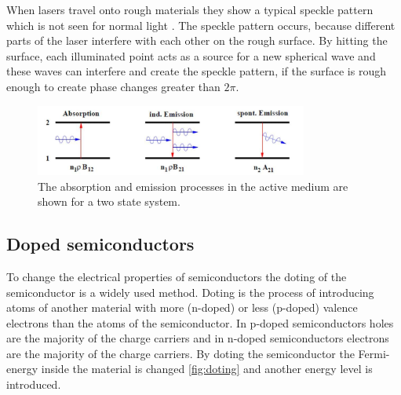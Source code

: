 When lasers travel onto rough materials they show a typical speckle pattern which is not seen for normal light \cite{speckle}.
The speckle pattern occurs, because different parts of the laser interfere with each other on the rough surface.
By hitting the surface, each illuminated point acts as a source for a new spherical wave and these waves can interfere and create the speckle pattern, if the surface is rough enough to create phase changes greater than $2\pi$.

\begin{figure}[ht]
    \center
    \includegraphics[width=0.8\textwidth]{bilder/emission.jpg}
    \caption{The absorption and emission processes in the active medium are shown for a two state system. \cite{anleitungHeNe}}
    \label{fig:emission}
\end{figure}

\subsection{Doped semiconductors}
\label{sec:doting}
To change the electrical properties of semiconductors the doting of the semiconductor is a widely used method.
Doting is the process of introducing atoms of another material with more (n-doped) or less (p-doped) valence electrons than the atoms of the semiconductor.
In p-doped semiconductors holes are the majority of the charge carriers and in n-doped semiconductors electrons are the majority of the charge carriers.
By doting the semiconductor the Fermi-energy inside the material is changed \ref{fig:doting} and another energy level is introduced.

